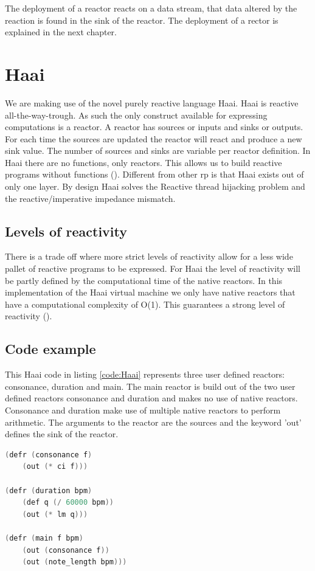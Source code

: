 \documentclass[a4paper]{book}
\begin{document}
The deployment of a reactor reacts on a data stream, that data altered by the reaction is found in the sink of the reactor. The deployment of a rector is explained in the next chapter.

\section{Haai}
We are making use of the novel purely reactive language Haai. Haai is reactive all-the-way-trough. As such the only construct available for expressing computations is a reactor. A reactor has sources or inputs and sinks or outputs. For each time the sources are updated the reactor will react and produce a new sink value. The number of sources and sinks are variable per reactor definition. In Haai there are no functions, only reactors. This allows us to build reactive programs without functions (\cite{oeyen_reactive_2024}). Different from other rp is that Haai exists out of only one layer. By design Haai solves the Reactive thread hijacking problem and the reactive/imperative impedance mismatch. 

\subsection*{Levels of reactivity}
There is a trade off where more strict levels of reactivity allow for a less wide pallet of reactive programs to be expressed. For Haai the level of reactivity will be partly defined by the computational time of the native reactors. In this implementation of the Haai virtual machine we only have native reactors that have a computational complexity of O(1). This guarantees a strong level of reactivity (\cite{oeyen_reactive_2024}).

\subsection*{Code example}
This Haai code in listing \ref{code:Haai} represents three user defined reactors: consonance, duration and main. The main reactor is build out of the two user defined reactors consonance and duration and makes no use of native reactors. Consonance and duration make use of multiple native reactors to perform arithmetic. The arguments to the reactor are the sources and the keyword 'out' defines the sink of the reactor.

\begin{lstlisting}[language=C, caption={Haai code}, label={code:Haai}, basicstyle=\ttfamily, frame=single]
(defr (consonance f)
	(out (* ci f)))

(defr (duration bpm)
	(def q (/ 60000 bpm))
	(out (* lm q)))

(defr (main f bpm)
	(out (consonance f))
	(out (note_length bpm)))
	
\end{lstlisting}
\end{document}
